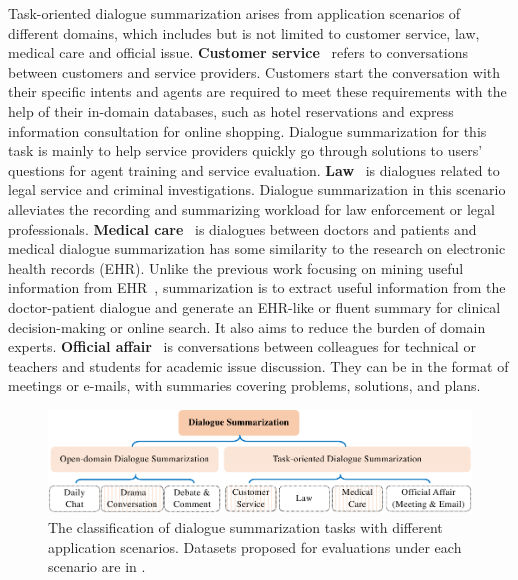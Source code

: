 Task-oriented dialogue summarization arises from application scenarios of different domains, which includes but is not limited to customer service, 
law, medical care and official issue.
\textbf{Customer service}~\cite{zou2021topic,feigenblat-etal-2021-tweetsumm-dialog,zhao2021todsum,liu2019automatic,chen2020jddc} refers to conversations between customers and service providers.
Customers start the conversation with their specific intents and agents are required to meet these requirements with the help of their in-domain databases, such as hotel reservations and express information consultation for online shopping. Dialogue summarization for this task is mainly to help service providers quickly go through solutions to users' questions for agent training and service evaluation. 
\textbf{Law}~\cite{fuzw20,duan2019legal,xi2020global} is dialogues related to legal service and 
criminal investigations. Dialogue summarization in this scenario alleviates the recording and summarizing workload 
for law enforcement or legal professionals. 
\textbf{Medical care}~\cite{joshi2020dr,song2020summarizing,song2020summarizing,zhang2021leveraging,liu2019topic} is dialogues between doctors and patients and medical dialogue summarization has some similarity to the research on electronic health records (EHR). Unlike the previous work focusing on mining useful information from EHR~\cite{yadav2018mining}, summarization is to extract useful information from the doctor-patient dialogue and generate an EHR-like or fluent summary for clinical decision-making or online search. It also aims to reduce the burden of domain experts.
\textbf{Official affair}~\cite{carletta2005ami,janin2003icsi,ulrich2008publicly,zhang2021emailsum} is conversations between colleagues for technical or teachers and students for academic issue discussion. They can be in the format of meetings or e-mails, with summaries covering problems, solutions, and plans.


\begin{figure}
	\centering
	\includegraphics[scale=0.65]{fig/scenarios.pdf}
	\caption{The classification of dialogue summarization tasks with different application scenarios. Datasets proposed for evaluations under each scenario are in .}
	\label{fig:scenario}
\end{figure}



